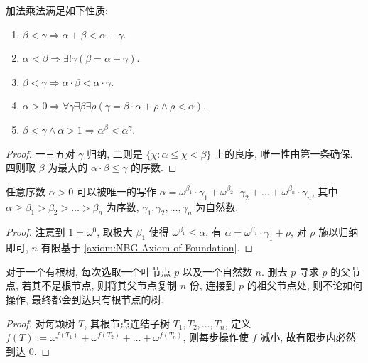 \begin{lemma}
    加法乘法满足如下性质:

    \begin{enumerate}
        \item \(\beta < \gamma \Rightarrow \alpha + \beta < \alpha + \gamma\).
        \item \(\alpha < \beta \Rightarrow \exists ! \gamma (\beta = \alpha + \gamma)\).
        \item \(\beta < \gamma \Rightarrow \alpha \cdot \beta < \alpha \cdot \gamma\).
        \item \(\alpha > 0 \Rightarrow \forall \gamma \exists \beta \exists \rho (\gamma = \beta \cdot \alpha + \rho \land \rho < \alpha)\).
        \item \(\beta < \gamma \land \alpha > 1 \Rightarrow \alpha^\beta < \alpha^\gamma\).
    \end{enumerate}

    \begin{proof}
        一三五对 \(\gamma\) 归纳, 二则是 \(\{\chi : \alpha \le \chi < \beta\}\) 上的良序, 唯一性由第一条确保.
        四则取 \(\beta\) 为最大的 \(\alpha \cdot \beta \le \gamma\) 的序数.
    \end{proof}
\end{lemma}

\begin{theorem}
    [Cantor] 任意序数 \(\alpha > 0\) 可以被唯一的写作
    \(\alpha = \omega^{\beta_1} \cdot \gamma_1 + \omega^{\beta_2} \cdot \gamma_2 + \dots + \omega^{\beta_n} \cdot \gamma_n\),
    其中 \(\alpha \ge \beta_1 > \beta_2 > \dots > \beta_n\) 为序数, \(\gamma_1, \gamma_2, \dots, \gamma_n\) 为自然数.

    \begin{proof}
        注意到 \(1 = \omega^0\), 取极大 \(\beta_1\) 使得 \(\omega^{\beta_1} \le \alpha\), 有 \(\alpha = \omega^{\beta_1} \cdot \gamma_1 + \rho\),
        对 \(\rho\) 施以归纳即可, \(n\) 有限基于 \ref{axiom:NBG Axiom of Foundation}.
    \end{proof}
\end{theorem}

\begin{example}
    [Hydra 数] 对于一个有根树, 每次选取一个叶节点 \(p\) 以及一个自然数 \(n\).
    删去 \(p\) 寻求 \(p\) 的父节点, 若其不是根节点, 则将其父节点复制 \(n\) 份,
    连接到 \(p\) 的祖父节点处, 则不论如何操作, 最终都会到达只有根节点的树.

    \begin{proof}
        对每颗树 \(T\), 其根节点连结子树 \(T_1, T_2, \dots, T_n\), 定义 \(f(T) := \omega^{f(T_1)} + \omega^{f(T_2)} + \dots + \omega^{f(T_n)}\),
        则每步操作使 \(f\) 减小, 故有限步内必然到达 \(0\).
    \end{proof}
\end{example}


